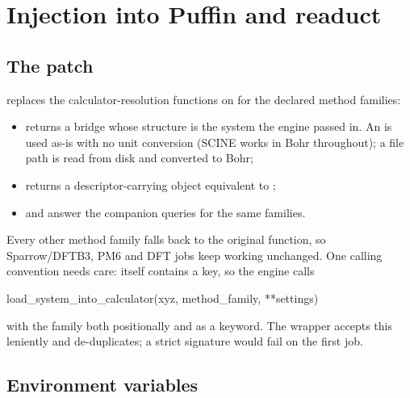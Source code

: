 \section{Injection into Puffin and readuct}
\label{sec:injection}

\subsection{The patch}
\label{sec:patch}

 replaces the calculator-resolution
functions on  for the declared method families:

\begin{itemize}
  \item {} returns a bridge whose structure
        is the system the engine passed in.  An  is used
        as-is with no unit conversion (SCINE works in Bohr throughout); a file
        path is read from disk and converted to Bohr;
  \item {} returns a descriptor-carrying
         object equivalent to ;
  \item {} and  answer the companion
        queries for the same families.
\end{itemize}

Every other method family falls back to the original function, so
Sparrow/DFTB3, PM6 and DFT jobs keep working unchanged.  One calling
convention needs care:  itself
contains a  key, so the engine calls

\begin{excerpt}
load_system_into_calculator(xyz, method_family, **settings)
\end{excerpt}

with the family both positionally and as a keyword.  The wrapper accepts this
leniently and de-duplicates; a strict signature would fail on the first job.

\subsection{Environment variables}
\label{sec:scine-env}

